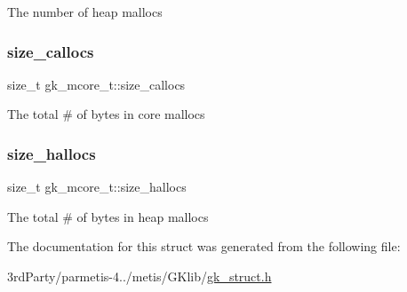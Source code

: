 The number of heap mallocs \mbox{\label{structgk__mcore__t_aa407f9b9ca318fa8afa36ab1c936ec07}} 
\subsubsection{\texorpdfstring{size\+\_\+callocs}{size\_callocs}}
{\footnotesize\ttfamily size\+\_\+t gk\+\_\+mcore\+\_\+t\+::size\+\_\+callocs}

The total \# of bytes in core mallocs \mbox{\label{structgk__mcore__t_a4c180c60538546b4ab67bb91264e1c6e}} 
\subsubsection{\texorpdfstring{size\+\_\+hallocs}{size\_hallocs}}
{\footnotesize\ttfamily size\+\_\+t gk\+\_\+mcore\+\_\+t\+::size\+\_\+hallocs}

The total \# of bytes in heap mallocs 

The documentation for this struct was generated from the following file\+:\begin{DoxyCompactItemize}
\item 
3rd\+Party/parmetis-\/4../metis/\+G\+Klib/\hyperlink{gk__struct_8h}{gk\+\_\+struct.\+h}\end{DoxyCompactItemize}
